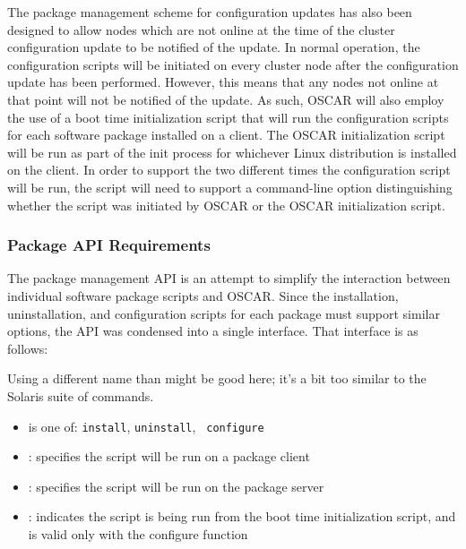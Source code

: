 The package management scheme for configuration updates has also been
designed to allow nodes which are not online at the time of the
cluster configuration update to be notified of the update. In normal
operation, the configuration scripts will be initiated on every
cluster node after the configuration update has been
performed. However, this means that any nodes not online at that point
will not be notified of the update. As such, OSCAR will also employ
the use of a boot time initialization script that will run the
configuration scripts for each software package installed on a
client. The OSCAR initialization script will be run as part of the
init process for whichever Linux distribution is installed on the
client. In order to support the two different times the configuration
script will be run, the script will need to support a command-line
option distinguishing whether the script was initiated by OSCAR or the
OSCAR initialization script.

\subsubsection{Package API Requirements}

The package management API is an attempt to simplify the interaction
between individual software package scripts and OSCAR.  Since the
installation, uninstallation, and configuration scripts for each
package must support similar options, the API was condensed into a
single interface. That interface is as follows:


\begin{discuss}
  Using a different name than  might be good here; it's
  a bit too similar to the Solaris  suite of commands.
\end{discuss}

\begin{itemize}
\item {} is one of: {\tt install}, {\tt uninstall}, {\tt
    configure}

\item {}: specifies the script will be run on a package client
  
\item {}: specifies the script will be run on the package server
  
\item {}: indicates the script is being run from the boot
  time initialization script, and is valid only with the configure
  function
\end{itemize}

